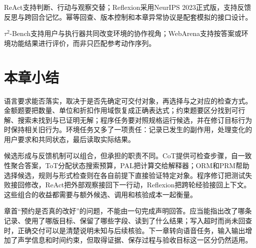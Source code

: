 \begin{fullwidth}
ReAct支持判断、行动与观察交替；Reflexion采用NeurIPS 2023正式版，支持反馈反思与跨回合记忆。幂等回查、版本控制和本章异常协议是配套模拟的接口设计。
\par{}
\par{}
\end{fullwidth}

\begin{fullwidth}
$\tau^2$-Bench支持用户与执行器共同改变环境的协作视角；WebArena支持按答案或环境功能结果进行评价，而非只匹配参考动作序列。
\par{}
\par{}
\end{fullwidth}

\section{本章小结}
\label{sec:nlp-execution-summary}

语言要求能否落实，取决于是否先确定可交付对象，再选择与之对应的检查方式。金额题要把数量、单位和折扣作用域恢复成正确表达式；约束题要区分找到可行解、搜索未找到与已证明无解；程序任务要对照规格运行候选，并在修订目标行为时保持相关旧行为。环境任务又多了一项责任：记录已发生的副作用，处理变化的用户要求和共同状态，最后读取实际结果。

候选形成与反馈机制可以组合，但承担的职责不同。CoT提供可检查步骤，自一致性聚合答案，ToT分配状态搜索预算，PAL把计算交给解释器；ORM和PRM帮助选择候选，规则与形式检查则在各自前提下直接验证特定对象。程序修订把测试失败接回修改，ReAct把外部观察接回下一行动，Reflexion把跨轮经验接回上下文。这些组合的收益都需要与额外候选、调用和核验成本一起衡量。

章首“预约是否真的改好”的问题，不能由一句完成声明回答。应当能指出改了哪条记录、使用了哪版目标、保留了哪些字段、读到了什么结果；写入超时而尚未回查时，正确交付可以是清楚说明未知与后续核验。下一章转向语音任务，输入输出增加了声学信息和时间约束，但取得证据、保存过程与验收目标这一区分仍然适用。
